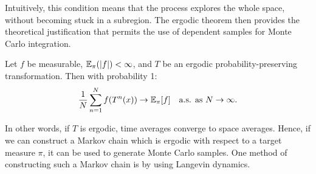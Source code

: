Intuitively, this condition means that the process explores the whole space, without becoming stuck in a subregion.  The ergodic theorem then provides the theoretical justification that permits the use of dependent samples for Monte Carlo integration.

\begin{theorem}\label{thm:ergodic}
 Let $f$ be measurable, $\mathbb{E}_\pi(|f|) < \infty$, and $T$ be an ergodic probability-preserving transformation. Then with probability 1:
 $$
\frac{1}{N} \sum_{n=1}^N f(T^n(x)) \to \mathbb{E}_\pi[f] \quad \text{a.s. as $N \to \infty$.}
$$
\end{theorem}
\noindent In other words, if $T$ is ergodic, time averages converge to space averages.  Hence, if we can construct a Markov chain which is ergodic with respect to a target measure $\pi$, it can be used to generate Monte Carlo samples.  One method of constructing such a Markov chain is by using Langevin dynamics.